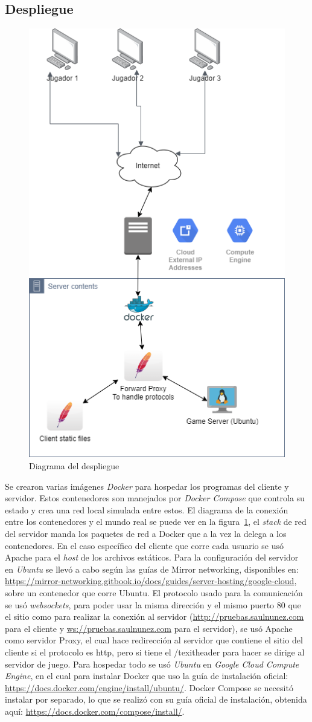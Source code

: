\subsection{Despliegue}
\begin{figure}[H]
    \centering
    \includegraphics[width=0.5\linewidth]{images/diagrama_deployment.png}
    \caption{Diagrama del despliegue}
    \label{fig:diagrama_despliege}
\end{figure}
Se crearon varias imágenes \textit{Docker} para hospedar los programas del cliente y servidor. Estos contenedores son manejados por \textit{Docker Compose} que controla su estado y crea una red local simulada entre estos. El diagrama de la conexión entre los contenedores y el mundo real se puede ver en la figura~\ref{fig:diagrama_despliege}, el \textit{stack} de red del servidor manda los paquetes de red a Docker que a la vez la delega a los contenedores.
En el caso específico del cliente que corre cada usuario se usó Apache para el \textit{host} de los archivos estáticos.
Para la configuración del servidor en \textit{Ubuntu} se llevó a cabo según las guías de Mirror networking, disponibles en: \url{https://mirror-networking.gitbook.io/docs/guides/server-hosting/google-cloud}, sobre un contenedor que corre Ubuntu.
El protocolo usado para la comunicación se usó \textit{websockets}, para poder usar la misma dirección y el mismo puerto 80 que el sitio como para realizar la conexión al servidor (\url{http://pruebas.saulnunez.com} para el cliente y \url{ws://pruebas.saulnunez.com} para el servidor), se usó Apache como servidor Proxy, el cual hace redirección al servidor que contiene el sitio del cliente si el protocolo es http, pero si tiene el /texit{header} para hacer se dirige al servidor de juego.
Para hospedar todo se usó \textit{Ubuntu} en \textit{Google Cloud Compute Engine}, en el cual para instalar Docker que uso la guía de instalación oficial: \url{https://docs.docker.com/engine/install/ubuntu/}. Docker Compose se necesitó instalar por separado, lo que se realizó con su guía oficial de instalación, obtenida aquí: \url{https://docs.docker.com/compose/install/}.

